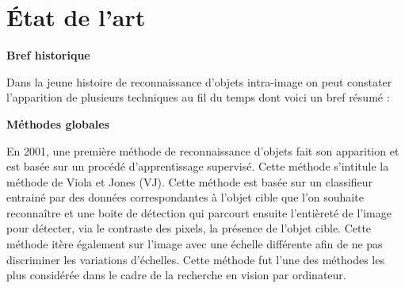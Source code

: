 \documentclass[a4paper,12pt]{article} %
\begin{document}
\section{État de l'art} %
\textbf{Bref historique}\newline
\par
	Dans la jeune histoire de reconnaissance d’objets intra-image on peut constater l’apparition de plusieurs techniques au fil du temps dont voici un bref résumé :\newline

\textbf{Méthodes globales}\newline
\par
	En 2001, une première méthode de reconnaissance d’objets fait son apparition et est basée sur un procédé d’apprentissage supervisé. Cette méthode s’intitule la méthode de Viola et Jones (VJ). Cette méthode est basée sur un classifieur entrainé par des données correspondantes à l’objet cible que l’on souhaite reconnaître et une boite de détection  qui parcourt ensuite l’entièreté de l’image pour détecter, via le contraste des pixels, la présence de l’objet cible. Cette méthode itère également sur l’image avec une échelle différente afin de ne pas discriminer les variations d’échelles. Cette méthode fut l’une des méthodes les plus considérée dans le cadre de la recherche en vision par ordinateur.\newline
\end{document}
